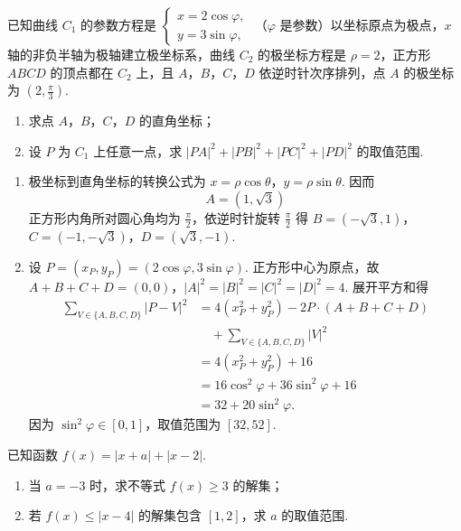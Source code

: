 \begin{problem}
已知曲线 \(C_1\) 的参数方程是 \(\begin{cases}
x = 2\cos \varphi,\\
y = 3\sin \varphi,
\end{cases}\) （\(\varphi\) 是参数）以坐标原点为极点，\(x\) 轴的非负半轴为极轴建立极坐标系，曲线 \(C_2\) 的极坐标方程是 \(\rho = 2\)，正方形 \(ABCD\) 的顶点都在 \(C_2\) 上，且 \(A\)，\(B\)，\(C\)，\(D\) 依逆时针次序排列，点 \(A\) 的极坐标为 \(\left(2, \frac{\pi}{3}\right)\).

\begin{enumerate}
\item 求点 \(A\)，\(B\)，\(C\)，\(D\) 的直角坐标；
\item 设 \(P\) 为 \(C_1\) 上任意一点，求 \(|PA|^2 + |PB|^2 + |PC|^2 + |PD|^2\) 的取值范围.
\end{enumerate}
\end{problem}

\begin{solution}
\begin{enumerate}
\item 极坐标到直角坐标的转换公式为 \(x=\rho\cos\theta\)，\(y=\rho\sin\theta\). 因而
\[
A=\left(1,\sqrt3\right)
\]
正方形内角所对圆心角均为 \(\frac{\pi}{2}\)，依逆时针旋转 \(\frac{\pi}{2}\) 得
\(B=(-\sqrt3,1)\)，\(C=(-1,-\sqrt3)\)，\(D=(\sqrt3,-1)\).
\item 设 \(P=(x_P,y_P)=(2\cos\varphi,3\sin\varphi)\). 正方形中心为原点，故
\(A+B+C+D=(0,0)\)，\(|A|^2=|B|^2=|C|^2=|D|^2=4\).
展开平方和得
\[
\begin{aligned}
\sum_{V\in\{A,B,C,D\}}|P-V|^2
&=4(x_P^2+y_P^2)-2P\cdot(A+B+C+D)\\
&\quad+\sum_{V\in\{A,B,C,D\}}|V|^2\\
&=4(x_P^2+y_P^2)+16\\
&=16\cos^2\varphi+36\sin^2\varphi+16\\
&=32+20\sin^2\varphi.
\end{aligned}
\]
因为 \(\sin^2\varphi\in[0,1]\)，取值范围为 \([32,52]\).
\end{enumerate}
\end{solution}

\begin{problem}
已知函数 \( f(x) = |x + a| + |x - 2| \).

\begin{enumerate}
\item 当 \(a = -3\) 时，求不等式 \(f(x) \geqslant 3\) 的解集；
\item 若 \( f(x) \leqslant |x - 4| \) 的解集包含 \([1, 2]\)，求 \( a \) 的取值范围.
\end{enumerate}
\end{problem}

